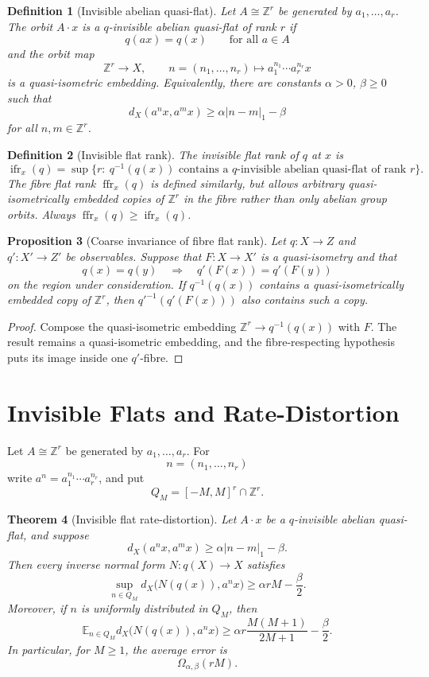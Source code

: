 \documentclass[11pt]{article}
\newtheorem{theorem}{Theorem}[section]
\newtheorem{proposition}[theorem]{Proposition}
\newtheorem{definition}[theorem]{Definition}
\DeclareMathOperator{\ifr}{ifr}
\DeclareMathOperator{\ffr}{ffr}
\begin{document}
\begin{definition}[Invisible abelian quasi-flat]
Let \(A\cong \mathbb Z^r\) be generated by \(a_1,\ldots,a_r\).  The orbit
\(A\cdot x\) is a \(q\)-invisible abelian quasi-flat of rank \(r\) if
\[
q(ax)=q(x)
\qquad
\text{for all } a\in A
\]
and the orbit map
\[
\mathbb Z^r\to X,
\qquad
n=(n_1,\ldots,n_r)\mapsto a_1^{n_1}\cdots a_r^{n_r}x
\]
is a quasi-isometric embedding.  Equivalently, there are constants
\(\alpha>0\), \(\beta\ge0\) such that
\[
d_X(a^n x,a^m x)
\ge
\alpha |n-m|_1-\beta
\]
for all \(n,m\in \mathbb Z^r\).
\end{definition}

\begin{definition}[Invisible flat rank]
The invisible flat rank of \(q\) at \(x\) is
\[
\ifr_x(q)=
\sup\{r:\ q^{-1}(q(x))\text{ contains a }q\text{-invisible abelian quasi-flat of rank }r\}.
\]
The fibre flat rank \(\ffr_x(q)\) is defined similarly, but allows arbitrary
quasi-isometrically embedded copies of \(\mathbb Z^r\) in the fibre rather than
only abelian group orbits.  Always \(\ffr_x(q)\ge \ifr_x(q)\).
\end{definition}

\begin{proposition}[Coarse invariance of fibre flat rank]
Let \(q:X\to Z\) and \(q':X'\to Z'\) be observables.  Suppose that
\(F:X\to X'\) is a quasi-isometry and that
\[
q(x)=q(y)
\quad\Longrightarrow\quad
q'(F(x))=q'(F(y))
\]
on the region under consideration.  If \(q^{-1}(q(x))\) contains a
quasi-isometrically embedded copy of \(\mathbb Z^r\), then
\(q'^{-1}(q'(F(x)))\) also contains such a copy.
\end{proposition}

\begin{proof}
Compose the quasi-isometric embedding \(\mathbb Z^r\to q^{-1}(q(x))\) with
\(F\).  The result remains a quasi-isometric embedding, and the fibre-respecting
hypothesis puts its image inside one \(q'\)-fibre.
\end{proof}

\section{Invisible Flats and Rate-Distortion}

Let \(A\cong\mathbb Z^r\) be generated by \(a_1,\ldots,a_r\).  For
\[
n=(n_1,\ldots,n_r)
\]
write \(a^n=a_1^{n_1}\cdots a_r^{n_r}\), and put
\[
Q_M=[-M,M]^r\cap\mathbb Z^r.
\]

\begin{theorem}[Invisible flat rate-distortion]
Let \(A\cdot x\) be a \(q\)-invisible abelian quasi-flat, and suppose
\[
d_X(a^n x,a^m x)
\ge
\alpha |n-m|_1-\beta .
\]
Then every inverse normal form \(N:q(X)\to X\) satisfies
\[
\sup_{n\in Q_M}
d_X\bigl(N(q(x)),a^n x\bigr)
\ge
\alpha rM-\frac{\beta}{2}.
\]
Moreover, if \(n\) is uniformly distributed in \(Q_M\), then
\[
\mathbb E_{n\in Q_M}
d_X\bigl(N(q(x)),a^n x\bigr)
\ge
\alpha r\frac{M(M+1)}{2M+1}
-\frac{\beta}{2}.
\]
In particular, for \(M\ge1\), the average error is
\[
\Omega_{\alpha,\beta}(rM).
\]
\end{theorem}
\end{document}
